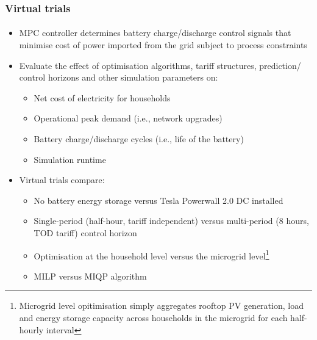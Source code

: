 \documentclass[presentation, smaller, xcolor=table]{beamer}
\begin{document}
\begin{frame}
	\frametitle{Virtual trials}
	\framesubtitle{}

	\begin{itemize}
		\item  MPC controller determines battery charge/discharge control signals that minimise cost of power imported from the grid subject to process constraints
		
		\item  Evaluate the effect of optimisation algorithms, tariff structures, prediction/ control horizons and other simulation parameters on:
		\begin{itemize}
			\item  Net cost of electricity for households
			\item  Operational peak demand (i.e., network upgrades)
			\item  Battery charge/discharge cycles (i.e., life of the battery)
			\item  Simulation runtime
		\end{itemize}
		
		\item  Virtual trials compare:
		\begin{itemize}
			\item  No battery energy storage versus Tesla Powerwall 2.0 DC installed
			\item  Single-period (half-hour, tariff independent) versus multi-period (8 hours, TOD tariff) control horizon
			\item  Optimisation at the household level versus the microgrid level\footnote{\scriptsize Microgrid level opitimisation simply aggregates rooftop PV generation, load and energy storage capacity across households in the microgrid for each half-hourly interval
			}
			\item  MILP versus MIQP algorithm
		\end{itemize}
	
	\end{itemize}

\end{frame}
\end{document}
